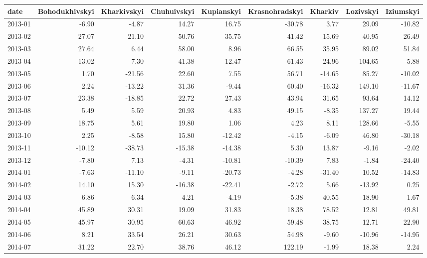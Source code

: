 \begin{table}[ht]
\centering
\begin{tabular}{lrrrrrrrr}
  \hline
date & Bohodukhivskyi & Kharkivskyi & Chuhuivskyi & Kupianskyi & Krasnohradskyi & Kharkiv & Lozivskyi & Iziumskyi \\ 
  \hline
2013-01 & -6.90 & -4.87 & 14.27 & 16.75 & -30.78 & 3.77 & 29.09 & -10.82 \\ 
  2013-02 & 27.07 & 21.10 & 50.76 & 35.75 & 41.42 & 15.69 & 40.95 & 26.49 \\ 
  2013-03 & 27.64 & 6.44 & 58.00 & 8.96 & 66.55 & 35.95 & 89.02 & 51.84 \\ 
  2013-04 & 13.02 & 7.30 & 41.38 & 12.47 & 61.43 & 24.96 & 104.65 & -5.88 \\ 
  2013-05 & 1.70 & -21.56 & 22.60 & 7.55 & 56.71 & -14.65 & 85.27 & -10.02 \\ 
  2013-06 & 2.24 & -13.22 & 31.36 & -9.44 & 60.40 & -16.32 & 149.10 & -11.67 \\ 
  2013-07 & 23.38 & -18.85 & 22.72 & 27.43 & 43.94 & 31.65 & 93.64 & 14.12 \\ 
  2013-08 & 5.49 & 5.59 & 20.93 & 4.83 & 49.15 & -8.35 & 137.27 & 19.44 \\ 
  2013-09 & 18.75 & 5.61 & 19.80 & 1.06 & 4.23 & 8.11 & 128.66 & -5.55 \\ 
  2013-10 & 2.25 & -8.58 & 15.80 & -12.42 & -4.15 & -6.09 & 46.80 & -30.18 \\ 
  2013-11 & -10.12 & -38.73 & -15.38 & -14.38 & 5.30 & 13.87 & -9.16 & -2.02 \\ 
  2013-12 & -7.80 & 7.13 & -4.31 & -10.81 & -10.39 & 7.83 & -1.84 & -24.40 \\ 
  2014-01 & -7.63 & -11.10 & -9.11 & -20.73 & -4.28 & -31.40 & 10.52 & -14.83 \\ 
  2014-02 & 14.10 & 15.30 & -16.38 & -22.41 & -2.72 & 5.66 & -13.92 & 0.25 \\ 
  2014-03 & 6.86 & 6.34 & 4.21 & -4.19 & -5.38 & 40.55 & 18.90 & 1.67 \\ 
  2014-04 & 45.89 & 30.31 & 19.09 & 31.83 & 18.38 & 78.52 & 12.81 & 49.81 \\ 
  2014-05 & 45.97 & 30.95 & 60.63 & 46.92 & 59.48 & 38.75 & 12.71 & 22.90 \\ 
  2014-06 & 8.21 & 33.54 & 26.21 & 30.63 & 54.98 & -9.60 & -10.96 & -14.95 \\ 
  2014-07 & 31.22 & 22.70 & 38.76 & 46.12 & 122.19 & -1.99 & 18.38 & 2.24 \\ 

\end{tabular}
\end{table}
